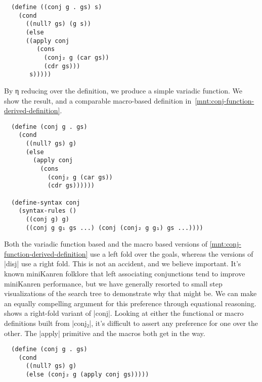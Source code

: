 \documentclass[sigplan,screen,draft,anonymous,review,natbib=false]{acmart}
\begin{document}
\begin{verbatim}
  (define ((conj g . gs) s)
    (cond
      ((null? gs) (g s))
      (else
      ((apply conj
         (cons
           (conj₂ g (car gs))
           (cdr gs)))
       s)))))
\end{verbatim}

By η reducing over the definition, we produce a simple variadic
function. We show the result, and a comparable macro-based definition
in~\cref{mnt:conj-function-derived-definition}.

\begin{listing}
\begin{verbatim}
  (define (conj g . gs)
    (cond
      ((null? gs) g)
      (else
        (apply conj
          (cons
            (conj₂ g (car gs))
            (cdr gs))))))

  (define-syntax conj
    (syntax-rules ()
      ((conj g) g)
      ((conj g g₁ gs ...) (conj (conj₂ g g₁) gs ...))))
\end{verbatim}
  \caption{Derived \rackinline|conj₂|-based function and macro.}
  \label{mnt:conj-function-derived-definition}
\end{listing}

Both the variadic function based and the macro based versions of
\cref{mnt:conj-function-derived-definition} use a left fold over the
goals, whereas the versions of \rackinline|disj| use a right fold.
This is not an accident, and we believe important. It's known
miniKanren folklore that left associating conjunctions tend to improve
miniKanren performance, but we have generally resorted to small step
visualizations of the search tree to demonstrate why that might be. We
can make an equally compelling argument for this preference through
equational reasoning.  shows a
right-fold variant of \rackinline|conj|. Looking at either the
functional or macro definitions built from \rackinline|conj₂|, it's
difficult to assert any preference for one over the other. The
\rackinline|apply| primitive and the macros both get in the way.

\begin{listing}
\begin{verbatim}
  (define (conj g . gs)
    (cond
      ((null? gs) g)
      (else (conj₂ g (apply conj gs)))))
\end{verbatim}
  \caption{A right-fold variant of \rackinline|conj|.}
  \label{mnt:conj-right-fold-definition}
\end{listing}
\end{document}
